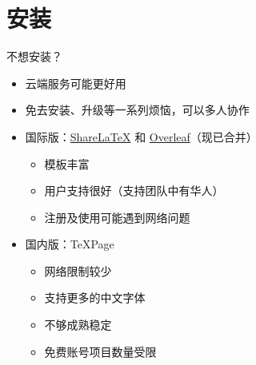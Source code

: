 \section{安装}

\begin{frame}{不想安装？}
\begin{itemize}
  \item 云端服务可能更好用
  \item 免去安装、升级等一系列烦恼，可以多人协作
  \item 国际版：\href{https://www.sharelatex.com}{\textcolor{酡红}{ShareLaTeX}} 和
        \href{https://www.overleaf.com}{\textcolor{松花绿}{Overleaf}}（现已合并）

    \begin{itemize}
      \item 模板丰富
      \item 用户支持很好（支持团队中有华人）
      \item 注册及使用可能遇到网络问题
    \end{itemize}

  \item 国内版：TeXPage 

    \begin{itemize}
      \item 网络限制较少
      \item 支持更多的中文字体
      \item 不够成熟稳定
      \item 免费账号项目数量受限
    \end{itemize}
\end{itemize}
\end{frame}

